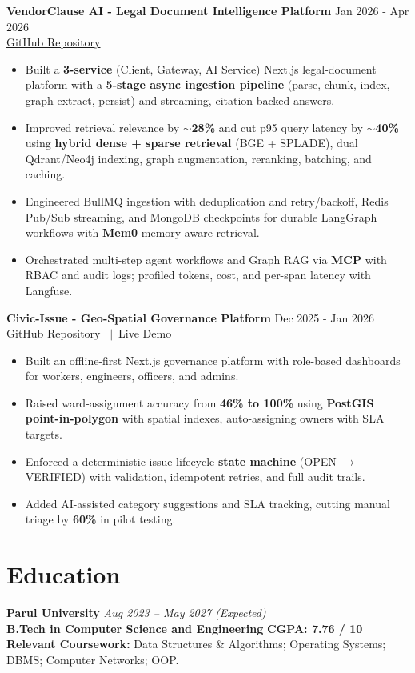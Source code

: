 \documentclass[a4paper,10pt]{article}
\begin{document}
\textbf{VendorClause AI - Legal Document Intelligence Platform} \hfill Jan 2026 - Apr 2026\\[1pt]
\href{https://github.com/CodeSahil21/VendorClause-Ai.git}{GitHub Repository}
\begin{itemize}
\item Built a \textbf{3-service} (Client, Gateway, AI Service) Next.js legal-document platform with a \textbf{5-stage async ingestion pipeline} (parse, chunk, index, graph extract, persist) and streaming, citation-backed answers.
\item Improved retrieval relevance by \textbf{$\sim$28\%} and cut p95 query latency by \textbf{$\sim$40\%} using \textbf{hybrid dense + sparse retrieval} (BGE + SPLADE), dual Qdrant/Neo4j indexing, graph augmentation, reranking, batching, and caching.
\item Engineered BullMQ ingestion with deduplication and retry/backoff, Redis Pub/Sub streaming, and MongoDB checkpoints for durable LangGraph workflows with \textbf{Mem0} memory-aware retrieval.
\item Orchestrated multi-step agent workflows and Graph RAG via \textbf{MCP} with RBAC and audit logs; profiled tokens, cost, and per-span latency with Langfuse.
\end{itemize}

\textbf{Civic-Issue - Geo-Spatial Governance Platform} \hfill Dec 2025 - Jan 2026\\[1pt]
\href{https://github.com/CodeSahil21/Civic-issue}{GitHub Repository} \ $|$\ \href{https://civic-issue-green.vercel.app}{Live Demo}
\begin{itemize}
\item Built an offline-first Next.js governance platform with role-based dashboards for workers, engineers, officers, and admins.
\item Raised ward-assignment accuracy from \textbf{46\% to 100\%} using \textbf{PostGIS point-in-polygon} with spatial indexes, auto-assigning owners with SLA targets.
\item Enforced a deterministic issue-lifecycle \textbf{state machine} (OPEN $\rightarrow$ VERIFIED) with validation, idempotent retries, and full audit trails.
\item Added AI-assisted category suggestions and SLA tracking, cutting manual triage by \textbf{60\%} in pilot testing.
\end{itemize}

\section{Education}
\textbf{Parul University} \hfill \textit{Aug 2023 -- May 2027 (Expected)}\\
\textbf{B.Tech in Computer Science and Engineering} \hfill \textbf{CGPA: 7.76 / 10}\\
\textbf{Relevant Coursework:} Data Structures \& Algorithms; Operating Systems; DBMS; Computer Networks; OOP.
\end{document}
